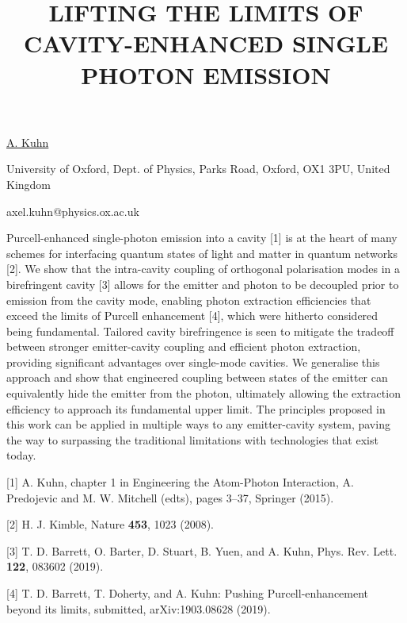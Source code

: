 \title{LIFTING THE LIMITS OF CAVITY-ENHANCED SINGLE PHOTON EMISSION}

\underline{A. Kuhn} 

{\normalsize{\vspace{-4mm}
University of Oxford,
Dept. of Physics,
Parks Road, Oxford,
OX1 3PU, United Kingdom




\email axel.kuhn@physics.ox.ac.uk}}

Purcell-enhanced single-photon emission into a cavity [1] is at the heart of many schemes for interfacing quantum states of light and matter in quantum networks [2]. We show that the intra-cavity coupling of orthogonal polarisation modes in a birefringent cavity [3] allows for the emitter and photon to be decoupled prior to emission from the cavity mode, enabling photon extraction efficiencies that exceed the limits of Purcell enhancement [4], which were hitherto considered being fundamental. Tailored cavity birefringence is seen to mitigate the tradeoff between stronger emitter-cavity coupling and efficient photon extraction, providing significant advantages over single-mode cavities. We generalise this approach and show that engineered coupling between states of the emitter can equivalently hide the emitter from the photon, ultimately allowing the extraction efficiency to approach its fundamental upper limit. The principles proposed in this work can be applied in multiple ways to any emitter-cavity system, paving the way to surpassing the traditional limitations with technologies that exist today.

{\normalsize
[1] A. Kuhn, chapter 1 in Engineering the Atom-Photon Interaction, A. Predojevic and M. W. Mitchell (edts), pages 3–37, Springer (2015).
\vsp

[2] H. J. Kimble, Nature \textbf{453}, 1023 (2008).
\vsp

[3] T. D. Barrett, O. Barter, D. Stuart, B. Yuen, and A. Kuhn, Phys. Rev. Lett. \textbf{122}, 083602 (2019).
\vsp

[4] T. D. Barrett, T. Doherty, and A. Kuhn: Pushing Purcell-enhancement beyond its limits, submitted, arXiv:1903.08628 (2019).
}

\vspace{\baselineskip}